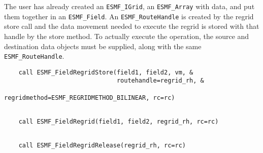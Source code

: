 
       
    The user has already created an {\tt ESMF\_IGrid}, an
    {\tt ESMF\_Array} with data, and put them together in an {\tt ESMF\_Field}.
    An {\tt ESMF\_RouteHandle} is created by the regrid store call 
    and the data movement needed to
    execute the regrid is stored with that handle by the store method. 
    To actually execute the operation, the source and destination data
    objects must be supplied, along with the same {\tt ESMF\_RouteHandle}. 

 \begin{verbatim}
    call ESMF_FieldRegridStore(field1, field2, vm, &
                               routehandle=regrid_rh, &
                               regridmethod=ESMF_REGRIDMETHOD_BILINEAR, rc=rc)
 
\end{verbatim}
 

 \begin{verbatim}
    call ESMF_FieldRegrid(field1, field2, regrid_rh, rc=rc)
 
\end{verbatim}
 

 \begin{verbatim}
    call ESMF_FieldRegridRelease(regrid_rh, rc=rc)
 
\end{verbatim}

\setlength{\parskip}{\oldparskip}
\setlength{\parindent}{\oldparindent}
\setlength{\baselineskip}{\oldbaselineskip}
